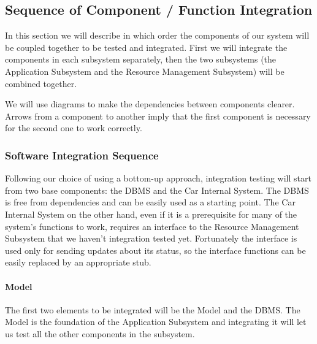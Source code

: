 \documentclass[english]{article}
\begin{document}
\subsection{Sequence of Component / Function Integration}
\label{subsec:sequence}
In this section we will describe in which order the components of our system will be coupled together to be tested and integrated.
First we will integrate the components in each subsystem separately, then the two subsystems (the Application Subsystem and the Resource Management Subsystem) will be combined together.

We will use diagrams to make the dependencies between components clearer. Arrows from a component to another imply that the first component is necessary for the second one to work correctly.


\subsubsection{Software Integration Sequence}

Following our choice of using a bottom-up approach, integration testing will start from two base components: the DBMS and the Car Internal System.
The DBMS is free from dependencies and can be easily used as a starting point.
The Car Internal System on the other hand, even if it is a prerequisite for many of the system's functions to work, requires an interface to the Resource Management Subsystem that we haven't integration tested yet. Fortunately the interface is used only for sending updates about its status, so the interface functions can be easily replaced by an appropriate stub.


\paragraph{Model}
The first two elements to be integrated will be the Model and the DBMS.
The Model is the foundation of the Application Subsystem and integrating it will let us test all the other components in the subsystem.

\begin{figure}[H]
	\centering
\end{figure}
\end{document}
